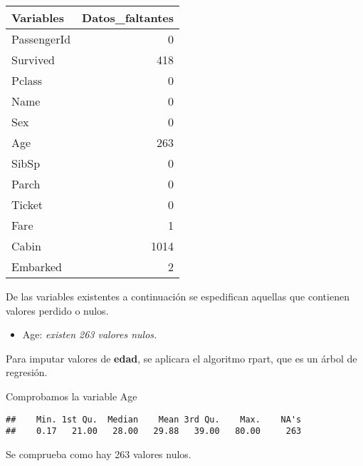 \documentclass[]{article}
\newenvironment{Shaded}{\begin{snugshade}}{\end{snugshade}}
\newcommand{\KeywordTok}[1]{\textcolor[rgb]{0.13,0.29,0.53}{\textbf{#1}}}
\newcommand{\OperatorTok}[1]{\textcolor[rgb]{0.81,0.36,0.00}{\textbf{#1}}}
\newcommand{\NormalTok}[1]{#1}
\providecommand{\tightlist}{%
  \setlength{\itemsep}{0pt}\setlength{\parskip}{0pt}}
\begin{document}
\begin{tabular}{l|r}
\hline
Variables & Datos\_faltantes\\
\hline
PassengerId & 0\\
\hline
Survived & 418\\
\hline
Pclass & 0\\
\hline
Name & 0\\
\hline
Sex & 0\\
\hline
Age & 263\\
\hline
SibSp & 0\\
\hline
Parch & 0\\
\hline
Ticket & 0\\
\hline
Fare & 1\\
\hline
Cabin & 1014\\
\hline
Embarked & 2\\
\hline
\end{tabular}

De las variables existentes a continuación se espedifican aquellas que
contienen valores perdido o nulos.

\begin{itemize}
\tightlist
\item
  Age: \emph{existen 263 valores nulos.}
\end{itemize}

Para imputar valores de \textbf{edad}, se aplicara el algoritmo rpart,
que es un árbol de regresión.

Comprobamos la variable Age

\begin{Shaded}
\end{Shaded}

\begin{verbatim}
##    Min. 1st Qu.  Median    Mean 3rd Qu.    Max.    NA's 
##    0.17   21.00   28.00   29.88   39.00   80.00     263
\end{verbatim}

Se comprueba como hay 263 valores nulos.
\end{document}

